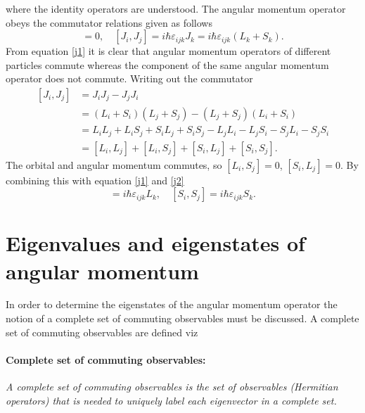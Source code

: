 where the identity operators are understood. The angular momentum operator obeys the commutator relations given as follows
\begin{equation}
	[J_{1i},J_{2j}]=0, \quad[J_i,J_j]=i\hbar\varepsilon_{ijk}J_k=i\hbar\varepsilon_{ijk}(L_k+S_k).
	\label{j1}
\end{equation} 
From equation \eqref{j1} it is clear that angular momentum operators of different particles commute whereas the component of the same angular momentum operator does not commute. Writing out the commutator
\begin{equation}
	\begin{split}
		[J_i,J_j]&=J_iJ_j-J_jJ_i\\
		&=(L_i+S_i)(L_j+S_j)-(L_j+S_j)(L_i+S_i)\\
		&=L_iL_j+L_iS_j+S_iL_j+S_iS_j-L_jL_i-L_jS_i-S_jL_i-S_jS_i\\
		&=[L_i,L_j]+[L_i,S_j]+[S_i,L_j]+[S_i,S_j].
	\end{split}
	\label{j2}
\end{equation} 
The orbital and angular momentum commutes, so $[L_i,S_j]=0$, $[S_i,L_j]=0$. By combining this with equation \eqref{j1} and \eqref{j2}
\begin{equation}
	[L_i,L_j]=i\hbar\varepsilon_{ijk}L_k, \quad [S_i,S_j]=i\hbar\varepsilon_{ijk}S_k.
\end{equation} 

\section{Eigenvalues and eigenstates of angular momentum}
In order to determine the eigenstates of the angular momentum operator the notion of a complete set of commuting observables must be discussed. A complete set of commuting observables are defined viz

\paragraph{Complete set of commuting observables:} \emph{A complete set of commuting observables is the set of observables (Hermitian operators) that is needed to uniquely label each eigenvector in a complete set.}\newline 


